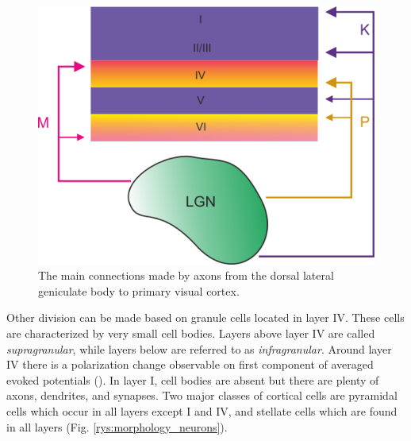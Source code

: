 \documentclass{pracalicmgr}
\begin{document}
   \begin{figure}[H]
   	\begin{center}
   		\includegraphics[scale=0.4]{aga_LGN.png}
   	\end{center}
   	\caption{The main connections made by axons from the dorsal lateral geniculate body to primary visual cortex.}
   	\label{rys:lgn}
   \end{figure}  
   \newpage
   Other division can be made based on granule cells located in layer IV. These cells are characterized by very small cell bodies. Layers above layer IV are called \emph{supragranular}, while layers below are referred to as \emph{infragranular}. Around layer IV there is a polarization change observable on first component of averaged evoked potentials (\cite{maier2010}). In layer I, cell bodies are absent but there are plenty of axons, dendrites, and synapses. Two major classes of cortical cells are pyramidal cells which occur in all layers except I and IV, and stellate cells which are found in all layers (Fig. \ref{rys:morphology_neurons}).
   
\end{document}
